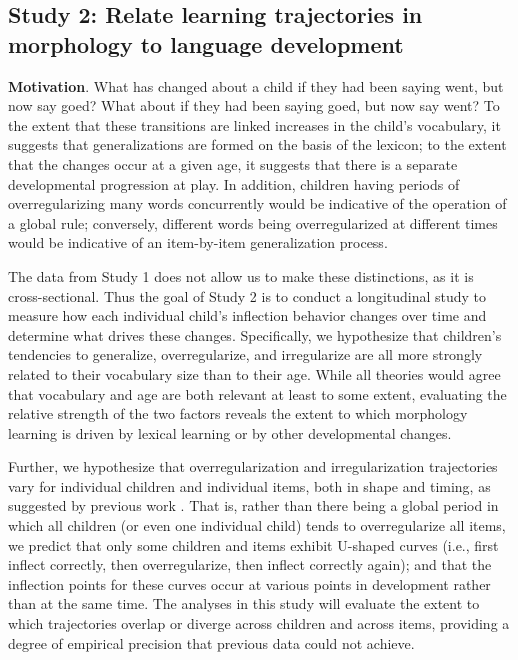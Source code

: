 \documentclass[
   11pt,
       ]{book}
\begin{document}
\hypertarget{study-2-relate-learning-trajectories-in-morphology-to-language-development}{%
\subsection{Study 2: Relate learning trajectories in morphology to language development}\label{study-2-relate-learning-trajectories-in-morphology-to-language-development}}

\textbf{Motivation}. What has changed about a child if they had been saying went, but now say goed? What about if they had been saying goed, but now say went? To the extent that these transitions are linked increases in the child's vocabulary, it suggests that generalizations are formed on the basis of the lexicon; to the extent that the changes occur at a given age, it suggests that there is a separate developmental progression at play. In addition, children having periods of overregularizing many words concurrently would be indicative of the operation of a global rule; conversely, different words being overregularized at different times would be indicative of an item-by-item generalization process.

The data from Study 1 does not allow us to make these distinctions, as it is cross-sectional. Thus the goal of Study 2 is to conduct a longitudinal study to measure how each individual child's inflection behavior changes over time and determine what drives these changes. Specifically, we hypothesize that children's tendencies to generalize, overregularize, and irregularize are all more strongly related to their vocabulary size than to their age. While all theories would agree that vocabulary and age are both relevant at least to some extent, evaluating the relative strength of the two factors reveals the extent to which morphology learning is driven by lexical learning or by other developmental changes.

Further, we hypothesize that overregularization and irregularization trajectories vary for individual children and individual items, both in shape and timing, as suggested by previous work \citep{hoeffner1992, plunkett1993}. That is, rather than there being a global period in which all children (or even one individual child) tends to overregularize all items, we predict that only some children and items exhibit U-shaped curves (i.e., first inflect correctly, then overregularize, then inflect correctly again); and that the inflection points for these curves occur at various points in development rather than at the same time. The analyses in this study will evaluate the extent to which trajectories overlap or diverge across children and across items, providing a degree of empirical precision that previous data could not achieve.
\end{document}
